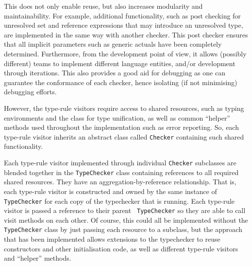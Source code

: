 \documentclass{llncs}
\begin{document}
This does not only enable reuse, but also increases modularity and
maintainability.  For example, additional functionality, such as post
checking for unresolved set and reference expressions that may
introduce an unresolved type, are implemented in the same way with
another checker. This post checker ensures that all implicit
parameters such as generic actuals have been completely determined.
Furthermore, from the development point of view, it allows (possibly
different) teams to implement different language entities, and/or
development through iterations.  This also provides a good aid for
debugging as one can guarantee the conformance of each checker, hence
isolating (if not minimising) debugging efforts.

However, the type-rule visitors require access to shared resources,
such as typing environments and the class for type unification, as
well as common ``helper'' methods used throughout the implementation
such as error reporting.  So, each type-rule visitor inherits an
abstract class called {\tt Checker} containing such shared
functionality.

Each type-rule visitor implemented through individual {\tt Checker}
subclasses are blended together in the {\tt TypeChecker} class
containing references to all required shared resources. They have an
aggregation-by-reference relationship.  That is, each type-rule
visitor is constructed and owned by the same instance of {\tt
TypeChecker} for each copy of the typechecker that is running.  Each
type-rule visitor is passed a reference to their parent {\tt
TypeChecker} so they are able to call visit methods on each other.  Of
course, this could all be implemented without the {\tt TypeChecker}
class by just passing each resource to a subclass, but the approach
that has been implemented allows extensions to the typechecker to
reuse constructors and other initialisation code, as well as different
type-rule visitors and ``helper'' methods.
\end{document}
